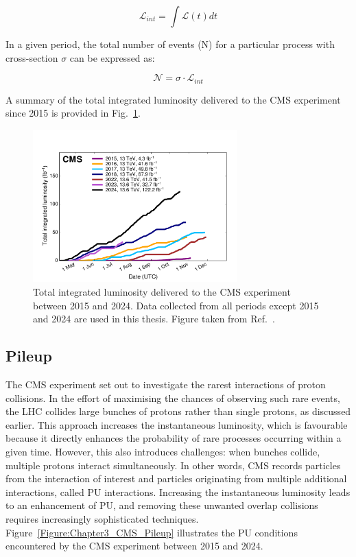 \begin{equation}
    \mathscr{L}_{int} = \int \mathscr{L}(t) dt
\end{equation}

In a given period, the total number of events (N) for a particular process with cross-section $\sigma$ can be expressed as:

\begin{equation}
    \mathscr{N} = \sigma \cdot \mathscr{L}_{int}
\end{equation}

A summary of the total integrated luminosity delivered to the CMS experiment since 2015 is provided in Fig.~\ref{Figure:Chapter3_CMS_IntegratedLumi}.

\begin{figure}[h]
\centering
\includegraphics[width= 0.7\textwidth]{Figures/Chapter3/CMS_IntegratedLumi.pdf}
\caption{Total integrated luminosity delivered to the CMS experiment between 2015 and 2024. Data collected from all periods except 2015 and 2024 are used in this thesis. Figure taken from Ref.~\cite{CMS_IntegratedLumi}.}
\label{Figure:Chapter3_CMS_IntegratedLumi}
\end{figure}

\subsection{Pileup}

The CMS experiment set out to investigate the rarest interactions of proton collisions. In the effort of maximising the chances of observing such rare events, the LHC collides large bunches of protons rather than single protons, as discussed earlier. This approach increases the instantaneous luminosity, which is favourable because it directly enhances the probability of rare processes occurring within a given time. However, this also introduces challenges: when bunches collide, multiple protons interact simultaneously. In other words, CMS records particles from the interaction of interest and particles originating from multiple additional interactions, called \ac{PU} interactions. Increasing the instantaneous luminosity leads to an enhancement of PU, and removing these unwanted overlap collisions requires increasingly sophisticated techniques. Figure~\ref{Figure:Chapter3_CMS_Pileup} illustrates the PU conditions encountered by the CMS experiment between 2015 and 2024.

